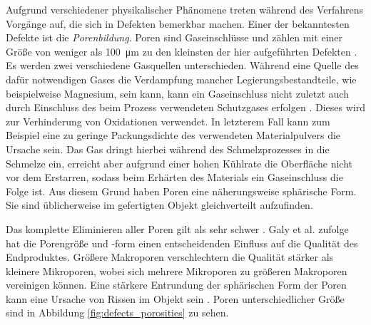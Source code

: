 		Aufgrund verschiedener physikalischer Phänomene treten während des Verfahrens Vorgänge
		auf, die sich in Defekten bemerkbar machen. Einer der bekanntesten Defekte ist die
		\emph{Porenbildung}. Poren sind Gaseinschlüsse und zählen mit einer Größe von weniger als
		\SI{100}{\micro\meter} zu den kleinsten der hier aufgeführten Defekten
		\cite{zhang2017defect}. Es werden zwei verschiedene Gasquellen unterschieden. Während eine
		Quelle des dafür notwendigen Gases die Verdampfung mancher Legierungsbestandteile, wie
		beispielweise Magnesium, sein kann, kann ein Gaseinschluss nicht zuletzt auch durch
		Einschluss des beim Prozess verwendeten Schutzgases erfolgen \cite{galy2018main}. Dieses
		wird zur Verhinderung von Oxidationen verwendet. In letzterem Fall kann zum Beispiel eine
		zu geringe Packungsdichte des verwendeten Materialpulvers die Ursache sein. Das Gas dringt
		hierbei während des Schmelzprozesses in die Schmelze ein, erreicht aber aufgrund einer
		hohen Kühlrate die Oberfläche nicht vor dem Erstarren, sodass beim Erhärten des Materials
		ein Gaseinschluss die Folge ist. Aus diesem Grund haben Poren eine näherungsweise
		sphärische Form. Sie sind üblicherweise im gefertigten Objekt gleichverteilt aufzufinden.

		Das komplette Eliminieren aller Poren gilt als sehr schwer \cite{zhang2017defect}.
		Galy et al. zufolge hat die Porengröße und -form einen entscheidenden Einfluss auf die
		Qualität des Endproduktes. Größere Makroporen verschlechtern die Qualität stärker als
		kleinere Mikroporen, wobei sich mehrere Mikroporen zu größeren Makroporen vereinigen
		können. Eine stärkere Entrundung der sphärischen Form der Poren kann eine Ursache von
		Rissen im Objekt sein \cite{galy2018main}. Poren unterschiedlicher Größe sind in Abbildung
		\ref{fig:defects_porosities} zu sehen.

